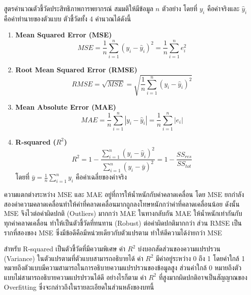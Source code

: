 \begin{myBox}[]{สูตรคำนวณตัวชี้วัดประสิทธิภาพการพยากรณ์}{}
สมมติให้มีข้อมูล $n$ ตัวอย่าง โดยที่ $y_i$ คือค่าจริงและ $\hat{y}_i$ คือค่าทำนายของตัวแบบ ตัวชี้วัดทั้ง 4 คำนวณได้ดังนี้

\begin{enumerate}
\item \textbf{Mean Squared Error (MSE)}
$$MSE = \frac{1}{n}\sum_{i=1}^{n}(y_i - \hat{y}_i)^2 = \frac{1}{n}\sum_{i=1}^{n}e_i^2$$

\item \textbf{Root Mean Squared Error (RMSE)}
$$RMSE = \sqrt{MSE} = \sqrt{\frac{1}{n}\sum_{i=1}^{n}(y_i - \hat{y}_i)^2}$$

\item \textbf{Mean Absolute Error (MAE)}
$$MAE = \frac{1}{n}\sum_{i=1}^{n}|y_i - \hat{y}_i| = \frac{1}{n}\sum_{i=1}^{n}|e_i|$$

\item \textbf{R-squared ($R^2$)}
$$R^2 = 1 - \frac{\sum_{i=1}^{n}(y_i - \hat{y}_i)^2}{\sum_{i=1}^{n}(y_i - \bar{y})^2} = 1 - \frac{SS_{res}}{SS_{tot}}$$
โดยที่ $\bar{y} = \frac{1}{n}\sum_{i=1}^{n}y_i$ คือค่าเฉลี่ยของค่าจริง
\end{enumerate}
\end{myBox}

ความแตกต่างระหว่าง MSE และ MAE อยู่ที่การให้น้ำหนักกับค่าคลาดเคลื่อน โดย MSE ยกกำลังสองค่าความคลาดเคลื่อนทำให้ค่าที่คลาดเคลื่อนมากถูกลงโทษหนักกว่าค่าที่คลาดเคลื่อนน้อย ดังนั้น MSE จึงไวต่อค่าผิดปกติ (Outliers) มากกว่า MAE ในทางกลับกัน MAE ให้น้ำหนักเท่ากันกับทุกค่าคลาดเคลื่อน ทำให้เป็นตัวชี้วัดที่ทนทาน (Robust) ต่อค่าผิดปกติมากกว่า ส่วน RMSE เป็นรากที่สองของ MSE ซึ่งมีข้อดีคือมีหน่วยเดียวกับตัวแปรตาม ทำให้ตีความได้ง่ายกว่า MSE

สำหรับ R-squared เป็นตัวชี้วัดที่มีความพิเศษ ค่า $R^2$ บ่งบอกสัดส่วนของความแปรปรวน (Variance) ในตัวแปรตามที่ตัวแบบสามารถอธิบายได้ ค่า $R^2$ มีค่าอยู่ระหว่าง 0 ถึง 1 โดยค่าใกล้ 1 หมายถึงตัวแบบมีความสามารถในการอธิบายความแปรปรวนของข้อมูลสูง ส่วนค่าใกล้ 0 หมายถึงตัวแบบไม่สามารถอธิบายความแปรปรวนได้ดี อย่างไรก็ตาม ค่า $R^2$ ที่สูงมากผิดปกติอาจเป็นสัญญาณของ Overfitting ซึ่งจะกล่าวถึงในรายละเอียดในส่วนหลังของบทนี้

